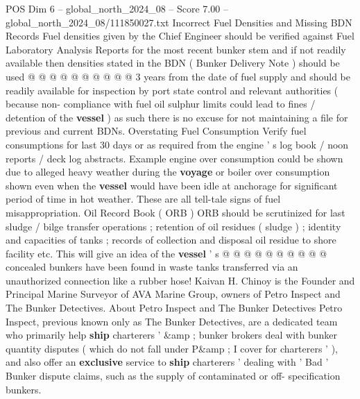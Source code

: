 \begin{textsample}{POS Dim 6 – global\_north\_2024\_08 – Score 7.00 – global\_north\_2024\_08/111850027.txt}
Incorrect Fuel Densities and Missing BDN Records Fuel densities given by the Chief Engineer should be verified against Fuel Laboratory Analysis Reports for the most recent bunker stem and if not readily available then densities stated in the BDN ( Bunker Delivery Note ) should be used @ @ @ @ @ @ @ @ @ @ 3 years from the date of fuel supply and should be readily available for inspection by port state control and relevant authorities ( because non- compliance with fuel oil sulphur limits could lead to fines / detention of the \textbf{vessel} ) as such there is no excuse for not maintaining a file for previous and current BDNs.
Overstating Fuel Consumption Verify fuel consumptions for last 30 days or as required from the engine ' s log book / noon reports / deck log abstracts.
Example engine over consumption could be shown due to alleged heavy weather during the \textbf{voyage} or boiler over consumption shown even when the \textbf{vessel} would have been idle at anchorage for significant period of time in hot weather.
These are all tell-tale signs of fuel misappropriation.
Oil Record Book ( ORB ) ORB should be scrutinized for last sludge / bilge transfer operations ; retention of oil residues ( sludge ) ; identity and capacities of tanks ; records of collection and disposal oil residue to shore facility etc.
This will give an idea of the \textbf{vessel} ' s @ @ @ @ @ @ @ @ @ @ concealed bunkers have been found in waste tanks transferred via an unauthorized connection like a rubber hose!
Kaivan H.
Chinoy is the Founder and Principal Marine Surveyor of AVA Marine Group, owners of Petro Inspect and The Bunker Detectives.
About Petro Inspect and The Bunker Detectives Petro Inspect, previous known only as The Bunker Detectives, are a dedicated team who primarily help \textbf{ship} charterers ' \&amp ; bunker brokers deal with bunker quantity disputes ( which do not fall under P\&amp ; I cover for charterers ' ), and also offer an \textbf{exclusive} service to \textbf{ship} charterers ' dealing with ' Bad ' Bunker dispute claims, such as the supply of contaminated or off- specification bunkers.

\end{textsample}
